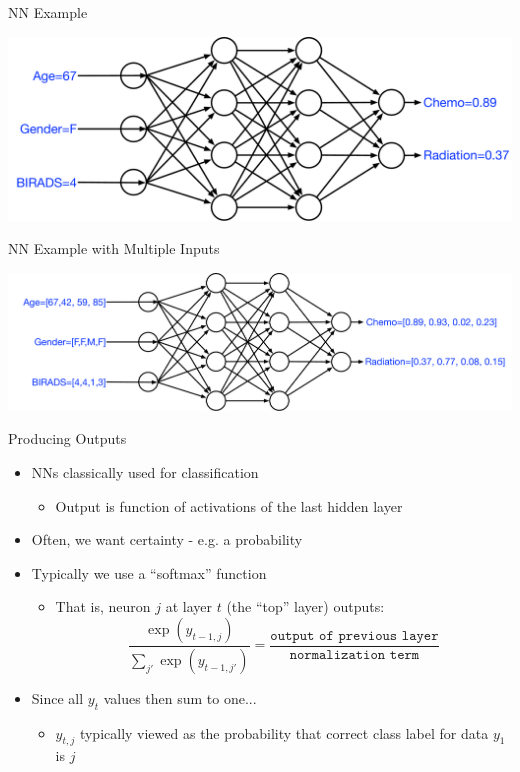 \documentclass[aspectratio=169]{beamer}
\begin{document}
\begin{frame}{NN Example}

\includegraphics[width=1\textwidth]{lectFF/nnExample.pdf}
\end{frame}
\begin{frame}{NN Example with Multiple Inputs}

\includegraphics[width=1\textwidth]{lectFF/nnExampleN.pdf}
\end{frame}
\begin{frame}{Producing Outputs}

\begin{itemize}
	\item NNs classically used for classification
	\begin{itemize}
	\item Output is function of activations of the last hidden layer
        \end{itemize}
      	\item Often, we want certainty - e.g. a probability
	\item Typically we use a ``softmax'' function
	\begin{itemize}
	\item That is, neuron $j$ at layer $t$ (the ``top'' layer) outputs:
	$$\frac{\exp(y_{t-1,j})} {\sum_{j'} \exp(y_{t-1,j'})} = \frac{\texttt{output of previous layer}}{\texttt{normalization term}}$$
        \end{itemize}
	\item Since all $y_t$ values then sum to one...
	\begin{itemize}
	\item $y_{t,j}$ typically viewed as the probability that correct class label for data $y_1$ is $j$
        \end{itemize}
\end{itemize}
\end{frame}
\end{document}
